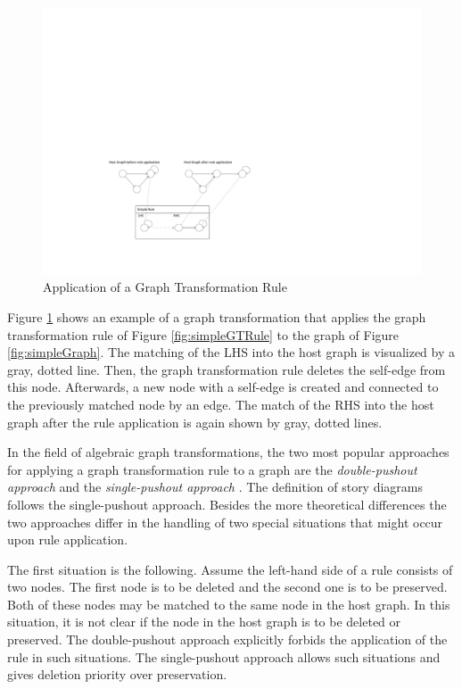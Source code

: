 \begin{figure}[htbp]
  \centering
  \includegraphics[width=\linewidth]{figures/GTApplication}
  \caption{Application of a Graph Transformation Rule}
  \label{fig:GTApplication}
\end{figure}

Figure \ref{fig:GTApplication} shows an example of a graph transformation that applies the graph transformation rule of Figure \ref{fig:simpleGTRule} to the graph of Figure \ref{fig:simpleGraph}. The matching of the LHS into the host graph is visualized by a gray, dotted line. Then, the graph transformation rule deletes the self-edge from this node. Afterwards, a new node with a self-edge is created and connected to the previously matched node by an edge. The match of the RHS into the host graph after the rule application is again shown by gray, dotted lines.

In the field of algebraic graph transformations, the two most popular approaches for applying a graph transformation rule to a graph are the
\emph{double-pushout approach} \cite{Roz97} and the \emph{single-pushout
approach} \cite{Roz97}. The definition of story diagrams follows the
single-pushout approach. Besides the more theoretical differences the two
approaches differ in the handling of two special situations that might occur
upon rule application.

The first situation is the following. Assume the left-hand side of a rule
consists of two nodes. The first node is to be deleted and the second one is
to be preserved. Both of these nodes may be matched to the same node in the host
graph. In this situation, it is not clear if the node in the host graph is to be
deleted or preserved. The double-pushout approach explicitly forbids the application of the rule in such
situations. The single-pushout approach allows such situations and gives
deletion priority over preservation.

